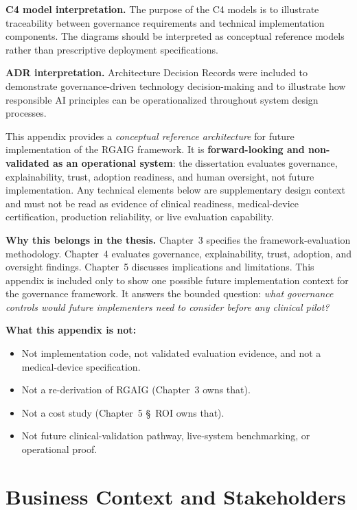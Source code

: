 \noindent\textbf{C4 model interpretation.} The purpose of the C4 models is to illustrate traceability between governance requirements and technical implementation components. The diagrams should be interpreted as conceptual reference models rather than prescriptive deployment specifications.

\noindent\textbf{ADR interpretation.} Architecture Decision Records were included to demonstrate governance-driven technology decision-making and to illustrate how responsible AI principles can be operationalized throughout system design processes.

\label{sec:appo_status}

\noindent This appendix provides a \emph{conceptual reference architecture} for future implementation of the RGAIG framework. It is \textbf{forward-looking and non-validated as an operational system}: the dissertation evaluates governance, explainability, trust, adoption readiness, and human oversight, not future implementation. Any technical elements below are supplementary design context and must not be read as evidence of clinical readiness, medical-device certification, production reliability, or live evaluation capability.

\noindent\textbf{Why this belongs in the thesis.} Chapter~3 specifies the framework-evaluation methodology. Chapter~4 evaluates governance, explainability, trust, adoption, and oversight findings. Chapter~5 discusses implications and limitations. This appendix is included only to show one possible future implementation context for the governance framework. It answers the bounded question: \emph{what governance controls would future implementers need to consider before any clinical pilot?}

\noindent\textbf{What this appendix is not:}
\begin{itemize}[leftmargin=*, itemsep=2pt]
    \item Not implementation code, not validated evaluation evidence, and not a medical-device specification.
    \item Not a re-derivation of RGAIG (Chapter~3 owns that).
    \item Not a cost study (Chapter~5 \S~ROI owns that).
    \item Not future clinical-validation pathway, live-system benchmarking, or operational proof.
\end{itemize}

\section{Business Context and Stakeholders}
\label{sec:appo_business}

